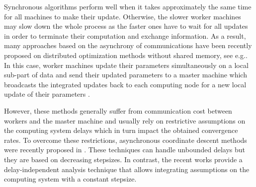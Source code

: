 Synchronous algorithms perform well when it takes approximately the same time for all machines to make their update. Otherwise, the slower worker machines may slow down the whole process as the faster ones have to wait for all updates in order to terminate their computation and exchange information. As a result, many approaches based on the asynchrony of communications have been recently proposed on distributed optimization methods without shared memory, see e.g.\;\cite{zhang2014asynchronous,ma2015adding,aytekin2016analysis,peng2016arock,calauzenes2017distributed}. In this case, worker machines update their parameters simultaneously on a local sub-part of data and send their updated parameters to a master machine which broadcasts the integrated updates back to each computing node for a new local update of their parameters \cite{li2013distributed,konevcny2016federated,ICML18}.


However, these methods generally suffer from communication cost between workers and the master machine and usually rely on restrictive assumptions on the computing system delays which in turn impact the obtained convergence rates. To overcome these restrictions, asynchronous coordinate descent methods were recently proposed in \cite{hannah2016unbounded,sun2017asynchronous}. These techniques can handle unbounded delays  but they are based on decreasing stepsizes. In contrast, the recent works \cite{ICML18,mishchenko2018} provide a delay-independent analysis technique that allows integrating assumptions on the computing system with a constant stepsize.


